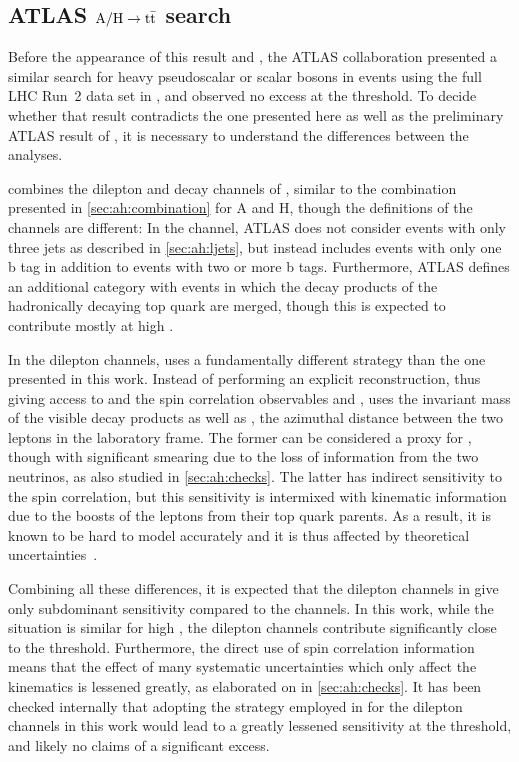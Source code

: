 \subsection{ATLAS \texorpdfstring{$\mathrm{A/H} \rightarrow \mathrm{t \bar{t}}$}{A/H -> tt} search}
\label{sec:ah:atlasah}

Before the appearance of this result and , the ATLAS collaboration presented a similar search for heavy pseudoscalar or scalar bosons in \ttbar events using the full LHC Run~2 data set in , and observed no excess at the \ttbar threshold. To decide whether that result contradicts the one presented here as well as the preliminary ATLAS result of , it is necessary to understand the differences between the analyses.

 combines the dilepton and \ljets decay channels of \ttbar, similar to the combination presented in \cref{sec:ah:combination} for A and H, though the definitions of the channels are different: In the \ljets channel, ATLAS does not consider events with only three jets as described in \cref{sec:ah:ljets}, but instead includes events with only one b tag in addition to events with two or more b tags. Furthermore, ATLAS defines an additional category with \ljets events in which the decay products of the hadronically decaying top quark are merged, though this is expected to contribute mostly at high \mtt.

In the dilepton channels,  uses a fundamentally different strategy than the one presented in this work. Instead of performing an explicit \ttbar reconstruction, thus giving access to \mtt and the spin correlation observables \chel and \chan,  uses the invariant mass \mbbll of the visible decay products as well as \dphill, the azimuthal distance between the two leptons in the laboratory frame. The former can be considered a proxy for \mtt, though with significant smearing due to the loss of information from the two neutrinos, as also studied in \cref{sec:ah:checks}. The latter has indirect sensitivity to the \ttbar spin correlation, but this sensitivity is intermixed with kinematic information due to the boosts of the leptons from their top quark parents. As a result, it is known to be hard to model accurately and it is thus affected by theoretical uncertainties~\cite{CMS:TOP-18-006,ATLAS:2019hau}.

Combining all these differences, it is expected that the dilepton channels in  give only subdominant sensitivity compared to the \ljets channels. In this work, while the situation is similar for high \mtt, the dilepton channels contribute significantly close to the \ttbar threshold. Furthermore, the direct use of spin correlation information means that the effect of many systematic uncertainties which only affect the kinematics is lessened greatly, as elaborated on in \cref{sec:ah:checks}. It has been checked internally that adopting the strategy employed in  for the dilepton channels in this work would lead to a greatly lessened sensitivity at the \ttbar threshold, and likely no claims of a significant excess.

